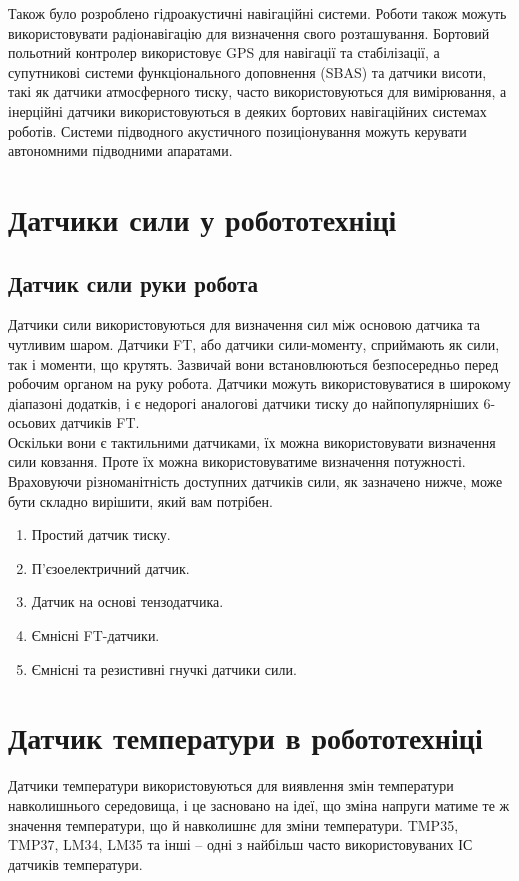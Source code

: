 \documentclass[a4paper,14pt]{extreport}
\begin{document}
Також було розроблено гідроакустичні навігаційні системи. Роботи також можуть використовувати радіонавігацію для визначення свого розташування. Бортовий польотний контролер використовує GPS для навігації та стабілізації, а супутникові системи функціонального доповнення (SBAS) та датчики висоти, такі як датчики атмосферного тиску, часто використовуються для вимірювання, а інерційні датчики використовуються в деяких бортових навігаційних системах роботів. Системи підводного акустичного позиціонування можуть керувати автономними підводними апаратами.

\section{Датчики сили у робототехніці}\par

  \subsection{Датчик сили руки робота}
  Датчики сили використовуються для визначення сил між основою датчика та чутливим шаром. Датчики FT, або датчики сили-моменту, сприймають як сили, так і моменти, що крутять. Зазвичай вони встановлюються безпосередньо перед робочим органом на руку робота. Датчики можуть використовуватися в широкому діапазоні додатків, і є недорогі аналогові датчики тиску до найпопулярніших 6-осьових датчиків FT.\\ 

  Оскільки вони є тактильними датчиками, їх можна використовувати визначення сили ковзання. Проте їх можна використовуватиме визначення потужності. Враховуючи різноманітність доступних датчиків сили, як зазначено нижче, може бути складно вирішити, який вам потрібен.\\ 
  \begin{enumerate}
  \item Простий датчик тиску.
  \item П'єзоелектричний датчик.
  \item Датчик на основі тензодатчика.
  \item Ємнісні FT-датчики.
  \item Ємнісні та резистивні гнучкі датчики сили.
  \end{enumerate}

\section{Датчик температури в робототехніці}\par
Датчики температури використовуються для виявлення змін температури навколишнього середовища, і це засновано на ідеї, що зміна напруги матиме те ж значення температури, що й навколишнє для зміни температури. TMP35, TMP37, LM34, LM35 та інші – одні з найбільш часто використовуваних ІС датчиків температури.
\end{document}
